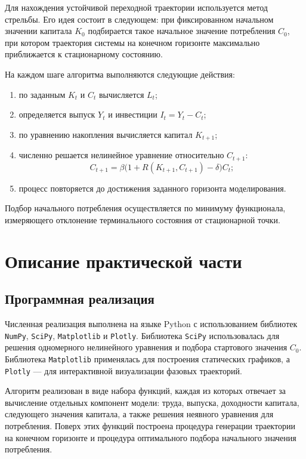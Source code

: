 \documentclass[14pt,a4paper]{extreport}
\begin{document}
    Для нахождения устойчивой переходной траектории используется метод стрельбы. Его идея состоит в следующем: при фиксированном начальном значении капитала $K_0$ подбирается такое начальное значение потребления $C_0$, при котором траектория системы на конечном горизонте максимально приближается к стационарному состоянию.

    На каждом шаге алгоритма выполняются следующие действия:
    \begin{enumerate}[label=\arabic*)]
        \item по заданным $K_t$ и $C_t$ вычисляется $L_t$;
        \item определяется выпуск $Y_t$ и инвестиции $I_t=Y_t-C_t$;
        \item по уравнению накопления вычисляется капитал $K_{t+1}$;
        \item численно решается нелинейное уравнение относительно $C_{t+1}$:
        \begin{equation}
        C_{t+1}=\beta\bigl(1+R(K_{t+1},C_{t+1})-\delta\bigr)C_t;
        \end{equation}
        \item процесс повторяется до достижения заданного горизонта моделирования.
    \end{enumerate}

    Подбор начального потребления осуществляется по минимуму функционала, измеряющего отклонение терминального состояния от стационарной точки.

\chapter{Описание практической части}
    \section{Программная реализация}

    Численная реализация выполнена на языке Python с использованием библиотек \texttt{NumPy}, \texttt{SciPy}, \texttt{Matplotlib} и \texttt{Plotly}. Библиотека \texttt{SciPy} использовалась для решения одномерного нелинейного уравнения и подбора стартового значения $C_0$. Библиотека \texttt{Matplotlib} применялась для построения статических графиков, а \texttt{Plotly} --- для интерактивной визуализации фазовых траекторий.

    Алгоритм реализован в виде набора функций, каждая из которых отвечает за вычисление отдельных компонент модели: труда, выпуска, доходности капитала, следующего значения капитала, а также решения неявного уравнения для потребления. Поверх этих функций построена процедура генерации траектории на конечном горизонте и процедура оптимального подбора начального значения потребления.
\end{document}
